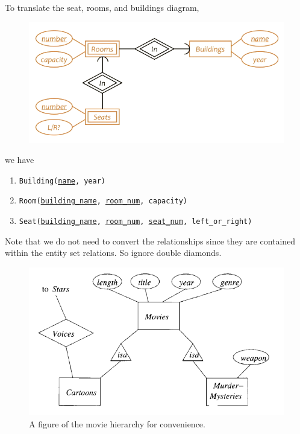 \documentclass{article}
\begin{document}
    \begin{example}
      To translate the seat, rooms, and buildings diagram, 
      \begin{figure}[H]
        \centering 
        \includegraphics[scale=0.4]{img/seat.png}
        \caption{} 
        \label{fig:seat}
      \end{figure}
      we have 
      \begin{enumerate}
        \item \texttt{Building(\underline{name}, year)} 
        \item \texttt{Room(\underline{building\_name}, \underline{room\_num}, capacity)}
        \item \texttt{Seat(\underline{building\_name}, \underline{room\_num}, \underline{seat\_num}, left\_or\_right)}
      \end{enumerate}
      Note that we do not need to convert the relationships since they are contained within the entity set relations. So ignore double diamonds. 
    \end{example}

    \begin{figure}[H]
      \centering 
      \includegraphics[scale=0.45]{img/movie_hierarchy.png}
      \caption{A figure of the movie hierarchy for convenience. } 
      \label{fig:movie_hierarchy}
    \end{figure}
\end{document}
